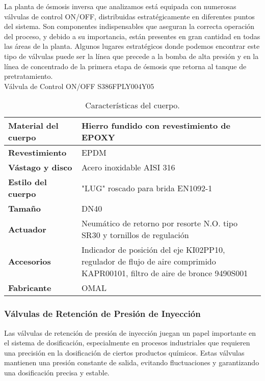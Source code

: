 La planta de ósmosis inversa que analizamos está equipada con numerosas válvulas de control ON/OFF, distribuidas estratégicamente en diferentes puntos del sistema. Son componentes indispensables que aseguran la correcta operación del proceso, y debido a su importancia, están presentes en gran cantidad en todas las áreas de la planta. Algunos lugares estratégicos donde podemos encontrar este tipo de válvulas puede ser la línea que precede a la bomba de alta presión y en la línea de concentrado de la primera etapa de ósmosis que retorna al tanque de pretratamiento.\\

Válvula de Control ON/OFF S386FPLY004Y05\\

\begin{table}[H]
    \centering
    \caption{Características del cuerpo.}
    \label{table:valvula_on_off}
    \begin{tabular}{| L{6cm} | L{6cm} |}
        \hline
        \textbf{Material del cuerpo} & Hierro fundido con revestimiento de EPOXY \\
        \hline
        \textbf{Revestimiento} & EPDM \\
        \hline
        \textbf{Vástago y disco} & Acero inoxidable AISI 316 \\
        \hline
        \textbf{Estilo del cuerpo} & "LUG" roscado para brida EN1092-1 \\
        \hline
        \textbf{Tamaño} & DN40 \\
        \hline
        \textbf{Actuador} & Neumático de retorno por resorte N.O. tipo SR30 y tornillos de regulación \\
        \hline
        \textbf{Accesorios} & Indicador de posición del eje KI02PP10, regulador de flujo de aire comprimido KAPR00101, filtro de aire de bronce 9490S001 \\
        \hline
        \textbf{Fabricante} & OMAL \\
        \hline
    \end{tabular}
\end{table}

\subsubsection{Válvulas de Retención de Presión de Inyección}

Las válvulas de retención de presión de inyección juegan un papel importante en el sistema de dosificación, especialmente en procesos industriales que requieren una precisión en la dosificación de ciertos productos químicos. Estas válvulas mantienen una presión constante de salida, evitando fluctuaciones y garantizando una dosificación precisa y estable.\\

